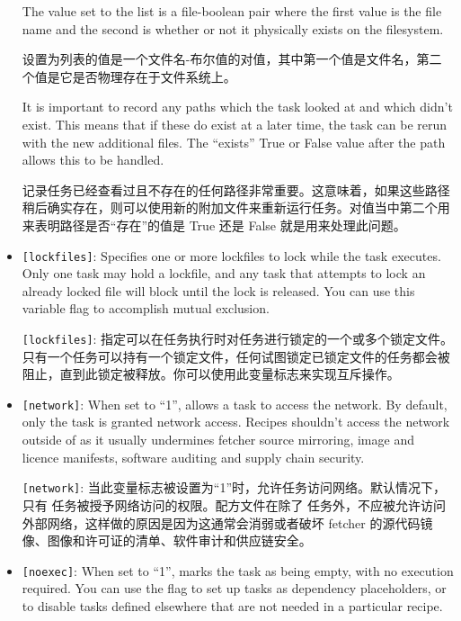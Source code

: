 \begin{itemize}
\medskip
The value set to the list is a file-boolean pair where the first value is the file name and the second is whether or not it physically exists on the filesystem.

\medskip
设置为列表的值是一个文件名-布尔值的对值，其中第一个值是文件名，第二个值是它是否物理存在于文件系统上。

\medskip
{}

\medskip
It is important to record any paths which the task looked at and which didn't exist. This means that if these do exist at a later time, the task can be rerun with the new additional files. The ``exists'' True or False value after the path allows this to be handled.

\medskip
记录任务已经查看过且不存在的任何路径非常重要。这意味着，如果这些路径稍后确实存在，则可以使用新的附加文件来重新运行任务。对值当中第二个用来表明路径是否``存在''的值是 True 还是 False 就是用来处理此问题。

\medskip
\item \texttt{[lockfiles]}: Specifies one or more lockfiles to lock while the task executes. Only one task may hold a lockfile, and any task that attempts to lock an already locked file will block until the lock is released. You can use this variable flag to accomplish mutual exclusion.

\medskip
\texttt{[lockfiles]}: 指定可以在任务执行时对任务进行锁定的一个或多个锁定文件。只有一个任务可以持有一个锁定文件，任何试图锁定已锁定文件的任务都会被阻止，直到此锁定被释放。你可以使用此变量标志来实现互斥操作。

\item \texttt{[network]}: When set to ``1'', allows a task to access the network. By default, only the  task is granted network access. Recipes shouldn't access the network outside of  as it usually undermines fetcher source mirroring, image and licence manifests, software auditing and supply chain security.

\medskip
\texttt{[network]}: 当此变量标志被设置为``1''时，允许任务访问网络。默认情况下，只有  任务被授予网络访问的权限。配方文件在除了  任务外，不应被允许访问外部网络，这样做的原因是因为这通常会消弱或者破坏 fetcher 的源代码镜像、图像和许可证的清单、软件审计和供应链安全。

\item \texttt{[noexec]}: When set to ``1'', marks the task as being empty, with no execution required. You can use the \code{[noexec]} flag to set up tasks as dependency placeholders, or to disable tasks defined elsewhere that are not needed in a particular recipe.


\end{itemize}
